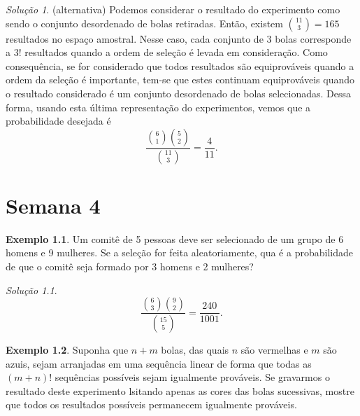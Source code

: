 \documentclass[]{book}
\theoremstyle{definition}
\theoremstyle{definition}
\newtheorem{example}{Exemplo}[chapter]
\theoremstyle{definition}
\theoremstyle{remark}
\newtheorem*{solution}{Solução}
\begin{document}
\begin{solution}
\iffalse{} {Solução. } \fi{}(alternativa)
Podemos considerar o resultado do experimento como sendo o conjunto desordenado de bolas retiradas.
Então, existem \({11 \choose 3}=165\) resultados no espaço amostral.
Nesse caso, cada conjunto de 3 bolas corresponde a \(3!\) resultados quando a ordem de seleção é levada em consideração.
Como consequência, se for considerado que todos resultados são equiprováveis quando a ordem da seleção é importante, tem-se que estes continuam equiprováveis quando o resultado considerado é um conjunto desordenado de bolas selecionadas.
Dessa forma, usando esta última representação do experimentos, vemos que a probabilidade desejada é
\[\frac{{6\choose 1}{5\choose 2}}{{11\choose 3}} = \frac{4}{11}.\]
\end{solution}

\hypertarget{sem4}{%
\chapter{Semana 4}\label{sem4}}

\begin{example}
\protect\hypertarget{exm:unnamed-chunk-135}{}{\label{exm:unnamed-chunk-135} }Um comitê de 5 pessoas deve ser selecionado de um grupo de 6 homens e 9 mulheres.
Se a seleção for feita aleatoriamente, qua é a probabilidade de que o comitê seja formado por 3 homens e 2 mulheres?
\end{example}

\begin{solution}
\iffalse{} {Solução. } \fi{}\[\frac{{6\choose 3}{9 \choose 2}}{{15 \choose 5}} = \frac{240}{1001}.\]
\end{solution}

\begin{example}
\protect\hypertarget{exm:unnamed-chunk-137}{}{\label{exm:unnamed-chunk-137} }Suponha que \(n+m\) bolas, das quais \(n\) são vermelhas e \(m\) são azuis, sejam arranjadas em uma sequência linear de forma que todas as \((m+n)!\) sequências possíveis sejam igualmente prováveis.
Se gravarmos o resultado deste experimento lsitando apenas as cores das bolas sucessivas, mostre que todos os resultados possíveis permanecem igualmente prováveis.
\end{example}
\end{document}
